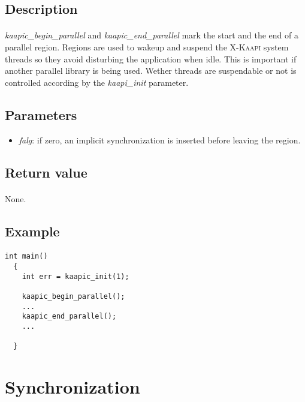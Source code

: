 \documentclass[a4paper, 11pt]{article}
\newcommand{\kaapi}{\textsc{X-Kaapi}\xspace}
\begin{document}
\subsection{Description}
\paragraph{}
\textit{kaapic\_begin\_parallel} and \textit{kaapic\_end\_parallel} mark the
start and the end of a parallel region. Regions are used to wakeup and suspend
the \kaapi system threads so they avoid disturbing the application when idle.
This is important if another parallel library is being used. Wether threads
are suspendable or not is controlled according by the \textit{kaapi\_init} parameter.

\subsection{Parameters}
\begin{itemize}
\item \textit{falg}: if zero, an implicit synchronization is inserted before leaving the region.
\end{itemize}

\subsection{Return value}
\paragraph{}
None.

\subsection{Example}
\paragraph{}
\begin{small}
\begin{lstlisting}[frame=tb]
  int main()
  {
    int err = kaapic_init(1);

    kaapic_begin_parallel();
    ...
    kaapic_end_parallel();
    ...

  }
\end{lstlisting}
\end{small}


\newpage
\section{Synchronization}
\end{document}
